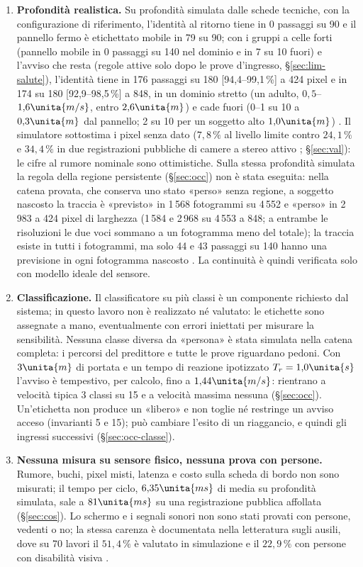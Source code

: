 \begin{enumerate}[label=\arabic*.,ref=\arabic*,leftmargin=1.8em]
\item \textbf{Profondità realistica.} Su profondità simulata dalle schede tecniche, con la configurazione di riferimento, l'identità al ritorno tiene in 0 passaggi su 90 e il pannello fermo è etichettato mobile in 79 su 90; con i gruppi a celle forti (pannello mobile in 0 passaggi su 140 nel dominio e in 7 su 10 fuori) e l'avviso che resta (regole attive solo dopo le prove d'ingresso, \S\ref{sec:lim-salute}), l'identità tiene in 176 passaggi su 180 [94,4--99,1\,\%] a 424 pixel e in 174 su 180 [92,9--98,5\,\%] a 848, in un dominio stretto (un adulto, $0{,}5$--$1{,}6\unita{m/s}$, entro $2{,}6\unita{m}$) e cade fuori (0--1 su 10 a $0{,}3\unita{m}$ dal pannello; 2 su 10 per un soggetto alto $1{,}0\unita{m}$) . Il simulatore sottostima i pixel senza dato ($7{,}8\,\%$ al livello limite contro $24{,}1\,\%$ e $34{,}4\,\%$ in due registrazioni pubbliche di camere a stereo attivo ; \S\ref{sec:val}): le cifre al rumore nominale sono ottimistiche. Sulla stessa profondità simulata la regola della regione persistente (\S\ref{sec:occ}) non è stata eseguita: nella catena provata, che conserva uno stato «perso» senza regione, a soggetto nascosto la traccia è «previsto» in 1\,568 fotogrammi su 4\,552 e «perso» in 2\,983 a 424 pixel di larghezza (1\,584 e 2\,968 su 4\,553 a 848; a entrambe le risoluzioni le due voci sommano a un fotogramma meno del totale); la traccia esiste in tutti i fotogrammi, ma solo 44 e 43 passaggi su 140 hanno una previsione in ogni fotogramma nascosto . La continuità è quindi verificata solo con modello ideale del sensore.
\item \textbf{Classificazione.} Il classificatore su più classi è un componente richiesto dal sistema; in questo lavoro non è realizzato né valutato: le etichette sono assegnate a mano, eventualmente con errori iniettati per misurare la sensibilità. Nessuna classe diversa da «persona» è stata simulata nella catena completa: i percorsi del predittore e tutte le prove riguardano pedoni. Con $3\unita{m}$ di portata e un tempo di reazione ipotizzato $T_r=1{,}0\unita{s}$ l'avviso è tempestivo, per calcolo, fino a $1{,}44\unita{m/s}$: rientrano a velocità tipica 3 classi su 15 e a velocità massima nessuna  (\S\ref{sec:occ}). Un'etichetta non produce un «libero» e non toglie né restringe un avviso acceso (invarianti 5 e 15); può cambiare l'esito di un riaggancio, e quindi gli ingressi successivi (\S\ref{sec:occ-classe}).
\item \textbf{Nessuna misura su sensore fisico, nessuna prova con persone.} Rumore, buchi, pixel misti, latenza e costo sulla scheda di bordo non sono misurati; il tempo per ciclo, $6{,}35\unita{ms}$ di media su profondità simulata, sale a $81\unita{ms}$ su una registrazione pubblica affollata  (\S\ref{sec:cos}). Lo schermo e i segnali sonori non sono stati provati con persone, vedenti o no; la stessa carenza è documentata nella letteratura sugli ausili, dove su 70 lavori il $51{,}4\,\%$ è valutato in simulazione e il $22{,}9\,\%$ con persone con disabilità visiva \cite{romlay2021}.
\end{enumerate}

